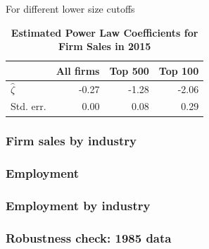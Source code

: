 \documentclass[12pt]{article}
\begin{document}
\begin{table}[htpb!]
\centering
\caption{\textbf{Estimated Power Law Coefficients for Firm Sales in 2015}}
For different lower size cutoffs\\
\begin{tabular}{lrrr}
  \hline
 & All firms & Top 500 & Top 100 \\ 
  \hline
$\hat{\zeta}$ & -0.27 & -1.28 & -2.06 \\ 
  Std. err. & 0.00 & 0.08 & 0.29 \\ 
   \hline
\end{tabular}
\end{table}

\subsubsection{Firm sales by industry}

\subsubsection{Employment}

\subsubsection{Employment by industry}

\subsubsection{Robustness check: 1985 data}
\end{document}
